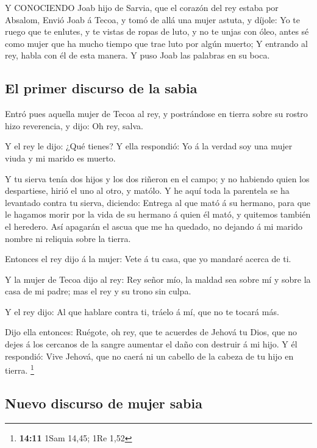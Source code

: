  Y CONOCIENDO Joab hijo de Sarvia, que el corazón del rey
estaba por Absalom,  Envió Joab á Tecoa, y tomó de allá una
mujer astuta, y díjole: Yo te ruego que te enlutes, y te vistas de ropas
de luto, y no te unjas con óleo, antes sé como mujer que ha mucho tiempo
que trae luto por algún muerto;  Y entrando al rey, habla
con él de esta manera. Y puso Joab las palabras en su boca.

\hypertarget{el-primer-discurso-de-la-sabia}{%
\subsection{El primer discurso de la
sabia}\label{el-primer-discurso-de-la-sabia}}

 Entró pues aquella mujer de Tecoa al rey, y postrándose en
tierra sobre su rostro hizo reverencia, y dijo: Oh rey, salva.

 Y el rey le dijo: ¿Qué tienes? Y ella respondió: Yo á la
verdad soy una mujer viuda y mi marido es muerto.

 Y tu sierva tenía dos hijos y los dos riñeron en el campo;
y no habiendo quien los despartiese, hirió el uno al otro, y matólo.
 Y he aquí toda la parentela se ha levantado contra tu
sierva, diciendo: Entrega al que mató á su hermano, para que le hagamos
morir por la vida de su hermano á quien él mató, y quitemos también el
heredero. Así apagarán el ascua que me ha quedado, no dejando á mi
marido nombre ni reliquia sobre la tierra.

 Entonces el rey dijo á la mujer: Vete á tu casa, que yo
mandaré acerca de ti.

 Y la mujer de Tecoa dijo al rey: Rey señor mío, la maldad
sea sobre mí y sobre la casa de mi padre; mas el rey y su trono sin
culpa.

 Y el rey dijo: Al que hablare contra ti, tráelo á mí, que
no te tocará más.

 Dijo ella entonces: Ruégote, oh rey, que te acuerdes de
Jehová tu Dios, que no dejes á los cercanos de la sangre aumentar el
daño con destruir á mi hijo. Y él respondió: Vive Jehová, que no caerá
ni un cabello de la cabeza de tu hijo en tierra. \footnote{\textbf{14:11}
  1Sam 14,45; 1Re 1,52}

\hypertarget{nuevo-discurso-de-mujer-sabia}{%
\subsection{Nuevo discurso de mujer
sabia}\label{nuevo-discurso-de-mujer-sabia}}

